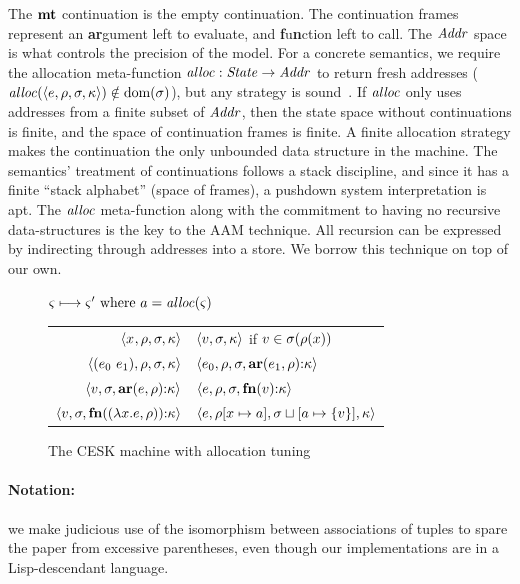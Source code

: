 %
The $\mathbf{mt}$ continuation is the empty continuation.
%
The continuation frames represent an \textbf{ar}gument left to evaluate, and \textbf{f}u\textbf{n}ction left to call.
%
%
The $\mathit{Addr}$ space is what controls the precision of the model.
%
For a concrete semantics, we require the allocation meta-function $\mathit{alloc} :
\mathit{State} \to \mathit{Addr}$ to return fresh addresses ($\mathit{alloc}(\langle e,\rho,\sigma,\kappa \rangle) \notin \text{dom}(\sigma)$), but any strategy is sound~\citep{dvanhorn:Might2009Posteriori}.
%
If $\mathit{alloc}$ only uses addresses from a finite subset of $\mathit{Addr}$, then the state space without continuations is finite, and the space of continuation frames is finite.
%
A finite allocation strategy makes the continuation the only unbounded data structure in the machine.
%
The semantics' treatment of continuations follows a stack discipline, and since it has a finite ``stack alphabet'' (space of frames), a pushdown system interpretation is apt.
%
The $\mathit{alloc}$ meta-function along with the commitment to having no recursive data-structures is the key to the AAM technique.
%
All recursion can be expressed by indirecting through addresses into a store.
%
We borrow this technique on top of our own.

\begin{figure}
  \centering
  $\varsigma \longmapsto \varsigma' \text{ where } a = \mathit{alloc}(\varsigma)$ \\
  \begin{tabular}{r|l}
    \hline
    $\langle x^{{}}, \rho, \sigma, \kappa \rangle$
    &
    $\langle v,\sigma,\kappa \rangle$ if $v \in \sigma(\rho(x))$
    \\
    $\langle (e_{0}\ e_{1}){}, \rho, \sigma, \kappa \rangle$
    &
    $\langle e_{0}, \rho, \sigma, \mathbf{ar}{}(e_{1},\rho){\tt :} \kappa \rangle$
    \\
    $\langle v, \sigma, \mathbf{ar}{}(e,\rho){\tt :} \kappa \rangle$
    &
    $\langle e, \rho, \sigma, \mathbf{fn}{}(v){\tt :} \kappa \rangle$
    \\
    $\langle v,\sigma,\mathbf{fn}{}((\lambda{} x. e, \rho)){\tt :} \kappa \rangle$
    &
    $\langle e, \rho[x \mapsto a], \sigma\sqcup[a \mapsto \{ v \}], \kappa \rangle$
  \end{tabular}
  \caption{The CESK machine with allocation tuning}
  \label{fig:base-semantics}
\end{figure}

\paragraph{Notation:} we make judicious use of the isomorphism between associations of tuples to spare the paper from excessive parentheses, even though our implementations are in a Lisp-descendant language.

